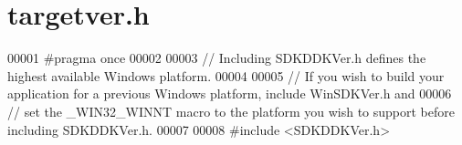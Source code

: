 \hypertarget{targetver_8h_source}{}\section{targetver.\+h}
\label{targetver_8h_source}

\begin{DoxyCode}
00001 \textcolor{preprocessor}{#pragma once}
00002 
00003 \textcolor{comment}{// Including SDKDDKVer.h defines the highest available Windows platform.}
00004 
00005 \textcolor{comment}{// If you wish to build your application for a previous Windows platform, include WinSDKVer.h and}
00006 \textcolor{comment}{// set the \_WIN32\_WINNT macro to the platform you wish to support before including SDKDDKVer.h.}
00007 
00008 \textcolor{preprocessor}{#include <SDKDDKVer.h>}
\end{DoxyCode}
